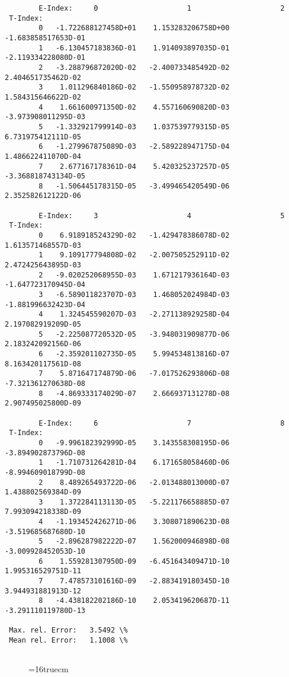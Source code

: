 \documentclass[12pt,dvipdfmx]{article}
\begin{document}
\begin{small}\begin{verbatim}
        E-Index:     0                     1                     2
 T-Index:
        0   -1.722688127458D+01    1.153283206758D+00   -1.683858517653D-01
        1   -6.130457183836D-01    1.914093897035D-01   -2.119334228080D-01
        2   -3.288796872020D-02   -2.400733485492D-02    2.404651735462D-02
        3    1.011296840186D-02   -1.550958978732D-02    1.584315646622D-02
        4    1.661600971350D-02    4.557160690820D-03   -3.973908011295D-03
        5   -1.332921799914D-03    1.037539779315D-05    6.731975412111D-05
        6   -1.279967875089D-03   -2.589228947175D-04    1.486622411070D-04
        7    2.677167178361D-04    5.420325237257D-05   -3.368818743134D-05
        8   -1.506445178315D-05   -3.499465420549D-06    2.352582612122D-06

        E-Index:     3                     4                     5
 T-Index:
        0    6.918918524329D-02   -1.429478386078D-02    1.613571468557D-03
        1    9.109177794808D-02   -2.007505252911D-02    2.472425643895D-03
        2   -9.020252068955D-03    1.671217936164D-03   -1.647723170945D-04
        3   -6.589011823707D-03    1.468052024984D-03   -1.881996632423D-04
        4    1.324545590207D-03   -2.271138929258D-04    2.197082919209D-05
        5   -2.225087720532D-05   -3.948031909877D-06    2.183242092156D-06
        6   -2.359201102735D-05    5.994534813816D-07    8.163420117561D-08
        7    5.871647174879D-06   -7.017526293806D-08   -7.321361270638D-08
        8   -4.869333174029D-07    2.666937131278D-08    2.907495025800D-09

        E-Index:     6                     7                     8
 T-Index:
        0   -9.996182392999D-05    3.143558308195D-06   -3.894902873796D-08
        1   -1.710731264281D-04    6.171658058460D-06   -8.994609018799D-08
        2    8.489265493722D-06   -2.013488013000D-07    1.438802569384D-09
        3    1.372284113113D-05   -5.221176658885D-07    7.993094218338D-09
        4   -1.193452426271D-06    3.308071890623D-08   -3.519685687680D-10
        5   -2.896287982222D-07    1.562000946898D-08   -3.009928452053D-10
        6    1.559281307950D-09   -6.451643409471D-10    1.995316529751D-11
        7    7.478573101616D-09   -2.883419180345D-10    3.944931881913D-12
        8   -4.438182202186D-10    2.053419620687D-11   -3.291110119780D-13

 Max. rel. Error:   3.5492 \%
 Mean rel. Error:   1.1008 \%


\end{verbatim}\end{small}
\begin{figure} \label{2.2.14a}
\epsfxsize=16truecm
\end{figure}
\newpage
\end{document}
